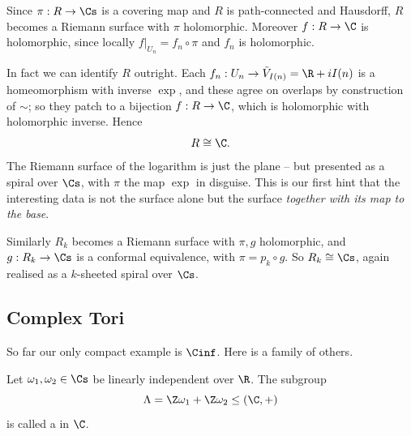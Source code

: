 \begin{example}
	Since $\pi : R \to \Cs$ is a covering map and $R$ is path-connected and Hausdorff,
	$R$ becomes a Riemann surface with $\pi$ holomorphic. Moreover $f : R \to \C$ is
	holomorphic, since locally $f|_{U_n} = f_n \circ \pi$ and $f_n$ is holomorphic.

	In fact we can identify $R$ outright. Each $f_n : U_n \to \tilde V_{I(n)} = \R + iI(n)$
	is a homeomorphism with inverse $\exp$, and these agree on overlaps by construction of
	$\sim$; so they patch to a bijection $f: R \to \C$, which is holomorphic with
	holomorphic inverse. Hence
	$$
	R \cong \C.
	$$
	The Riemann surface of the logarithm is just the plane -- but presented as a spiral
	over $\Cs$, with $\pi$ the map $\exp$ in disguise. This is our first hint that the
	interesting data is not the surface alone but the surface \emph{together with its map
	to the base}.
\end{example}

\begin{example}
	Similarly $R_k$ becomes a Riemann surface with $\pi, g$ holomorphic, and $g : R_k \to \Cs$
	is a conformal equivalence, with $\pi = p_k \circ g$. So $R_k \cong \Cs$, again realised
	as a $k$-sheeted spiral over $\Cs$.
\end{example}

\subsection{Complex Tori}\label{subsec:tori}

So far our only compact example is $\Cinf$. Here is a family of others.

\begin{definition}[Lattice]
	Let $\omega_1, \omega_2 \in \Cs$ be linearly independent over $\R$. The subgroup
	$$
	\Lambda = \Z\omega_1 + \Z \omega_2 \leq (\C, +)
	$$
	is called a  in $\C$.
\end{definition}

\begin{center}
\end{center}

